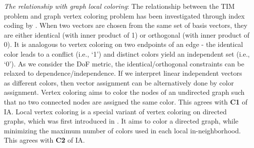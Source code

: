 \documentclass[a4paper,journal]{IEEEtran}
\begin{document}
\textit{The relationship with graph local coloring}:
The relationship between the TIM problem and graph vertex coloring problem has been investigated through index coding by \cite{shanmugam2013local}. 
When two vectors are chosen from the same set of basis vectors, they are either identical (with inner product of 1) or orthogonal (with inner product of 0). It is analogous to vertex coloring on two endpoints of an edge - the identical color leads to a conflict (i.e., `1') and distinct colors yield an independent set (i.e., `0'). As we consider the DoF metric, the identical/orthogonal constraints can be relaxed to dependence/independence.
If we interpret linear independent vectors as different colors, then vector assignment can be alternatively done by color assignment. Vertex coloring aims to color the nodes of an undirected graph such that no two connected nodes are assigned the same color. This agrees with \textbf{C1} of IA. Local vertex coloring is a special variant of vertex coloring on directed graphs, which was first introduced in \cite{KORNER2005101}.
It aims to color a directed graph, while minimizing the maximum number of colors used in each local in-neighborhood. This agrees with \textbf{C2} of IA. 
\end{document}
